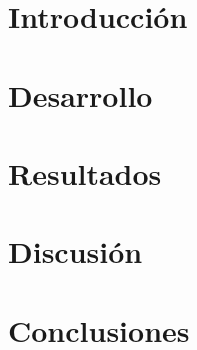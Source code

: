 \documentclass[a4paper, 10pt, twoside]{article}
\begin{document}
\newpage



\tableofcontents
\newpage


\section{Introducción}
\label{sec:introduccion}



\section{Desarrollo}
\label{sec:desarrollo}

\newpage


\section{Resultados}
\label{sec:resultados}

\newpage


\section{Discusión}
\label{sec:discusion}

\newpage


\section{Conclusiones}
\label{sec:conclusiones}

\end{document}
